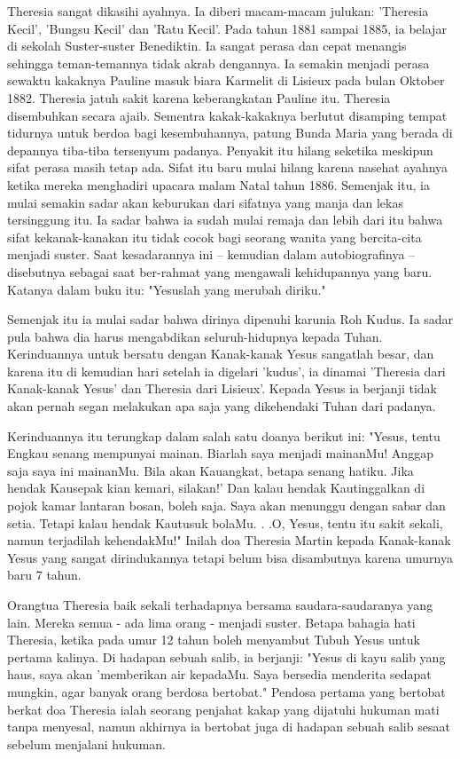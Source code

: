 \documentclass[12pt]{scrartcl}
\begin{document}
Theresia sangat dikasihi ayahnya. Ia diberi macam-macam julukan: 'Theresia Kecil', 'Bungsu Kecil' dan 'Ratu Kecil'. Pada tahun 1881 sampai 1885, ia belajar di sekolah Suster-suster Benediktin. Ia sangat perasa dan cepat menangis sehingga teman\hyp{}temannya tidak akrab dengannya. Ia semakin menjadi perasa sewaktu kakaknya Pauline masuk biara Karmelit di Lisieux pada bulan Oktober 1882. Theresia jatuh sakit karena keberangkatan Pauline itu. Theresia disembuhkan secara ajaib. Sementra kakak-kakaknya berlutut disamping tempat tidurnya untuk berdoa bagi kesembuhannya, patung Bunda Maria yang berada di depannya tiba-tiba tersenyum padanya. Penyakit itu hilang seketika meskipun sifat perasa masih tetap ada. Sifat itu baru mulai hilang karena nasehat ayahnya ketika mereka menghadiri upacara malam Natal tahun 1886. Semenjak itu, ia mulai semakin sadar akan keburukan dari sifatnya yang manja dan lekas tersinggung itu. Ia sadar bahwa ia sudah mulai remaja dan lebih dari itu bahwa sifat kekanak-kanakan itu tidak cocok bagi seorang wanita yang bercita-cita menjadi suster. Saat kesadarannya ini -- kemudian dalam autobiografinya -- disebutnya sebagai saat ber-rahmat yang mengawali kehidupannya yang baru. Katanya dalam buku itu: "Yesuslah yang merubah diriku."

Semenjak itu ia mulai sadar bahwa dirinya dipenuhi karunia Roh Kudus. Ia sadar pula bahwa dia harus mengabdikan seluruh-hidupnya kepada Tuhan. Kerinduannya untuk bersatu dengan Kanak-kanak Yesus sangatlah besar, dan karena itu di kemudian hari setelah ia digelari 'kudus', ia dinamai 'Theresia dari Kanak-kanak Yesus' dan Theresia dari Lisieux'. Kepada Yesus ia berjanji tidak akan pernah segan melakukan apa saja yang dikehendaki Tuhan dari padanya.

Kerinduannya itu terungkap dalam salah satu doanya berikut ini: "Yesus, tentu Engkau senang mempunyai mainan. Biarlah saya menjadi mainanMu! Anggap saja saya ini mainanMu. Bila akan Kauangkat, betapa senang hatiku. Jika hendak Kausepak kian kemari, silakan!' Dan kalau hendak Kautinggalkan di pojok kamar lantaran bosan, boleh saja. Saya akan menunggu dengan sabar dan setia. Tetapi kalau hendak Kautusuk bolaMu. . .O, Yesus, tentu itu sakit sekali, namun terjadilah kehendakMu!" Inilah doa Theresia Martin kepada Kanak-kanak Yesus yang sangat dirindukannya tetapi belum bisa disambutnya karena umurnya baru 7 tahun.

Orangtua Theresia baik sekali terhadapnya bersama saudara-saudaranya yang lain. Mereka semua - ada lima orang - menjadi suster. Betapa bahagia hati Theresia, ketika pada umur 12 tahun boleh menyambut Tubuh Yesus untuk pertama kalinya. Di hadapan sebuah salib, ia berjanji: "Yesus di kayu salib yang haus, saya akan 'memberikan air kepadaMu. Saya bersedia menderita sedapat mungkin, agar banyak orang berdosa bertobat." Pendosa pertama yang bertobat berkat doa Theresia ialah seorang penjahat kakap yang dijatuhi hukuman mati tanpa menyesal, namun akhirnya ia bertobat juga di hadapan sebuah salib sesaat sebelum menjalani hukuman.
\end{document}
